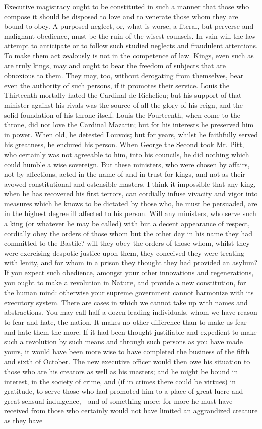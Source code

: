 Executive magistracy ought to be constituted in such a manner that those who compose it should be disposed to love and to venerate those whom they are bound to obey. A purposed neglect, or, what is worse, a literal, but perverse and malignant obedience, must be the ruin of the wisest counsels. In vain will the law attempt to anticipate or to follow such studied neglects and fraudulent attentions. To make them act zealously is not in the competence of law. Kings, even such as are truly kings, may and ought to bear the freedom of subjects that are obnoxious to them. They may, too, without derogating from themselves, bear even the authority of such persons, if it promotes their service. Louis the Thirteenth mortally hated the Cardinal de Richelieu; but his support of that minister against his rivals was the source of all the glory of his reign, and the solid foundation of his throne itself. Louis the Fourteenth, when come to the throne, did not love the Cardinal Mazarin; but for his interests he preserved him in power. When old, he detested Louvois; but for years, whilst he faithfully served his greatness, he endured his person. When George the Second took Mr. Pitt, who certainly was not agreeable to him, into his councils, he did nothing which could humble a wise sovereign. But these ministers, who were chosen by affairs, not by affections, acted in the name of and in trust for kings, and not as their avowed constitutional and ostensible masters. I think it impossible that any king, when he has recovered his first terrors, can cordially infuse vivacity and vigor into measures which he knows to be dictated by those who, he must be persuaded, are in the highest degree ill affected to his person. Will any ministers, who serve such a king (or whatever he may be called) with but a decent appearance of respect, cordially obey the orders of those whom but the other day in his name they had committed to the Bastile? will they obey the orders of those whom, whilst they were exercising despotic justice upon them, they conceived they were treating with lenity, and for whom in a prison they thought they had provided an asylum? If you expect such obedience, amongst your other innovations and regenerations, you ought to make a revolution in Nature, and provide a new constitution, for the human mind: otherwise your supreme government cannot harmonize with its executory system. There are cases in which we cannot take up with names and abstractions. You may call half a dozen leading individuals, whom we have reason to fear and hate, the nation. It makes no other difference than to make us fear and hate them the more. If it had been thought justifiable and expedient to make such a revolution by such means and through such persons as you have made yours, it would have been more wise to have completed the business of the fifth and sixth of October. The new executive officer would then owe his situation to those who are his creators as well as his masters; and he might be bound in interest, in the society of crime, and (if in crimes there could be virtues) in gratitude, to serve those who had promoted him to a place of great lucre and great sensual indulgence,—and of something more: for more he must have received from those who certainly would not have limited an aggrandized creature as they have 